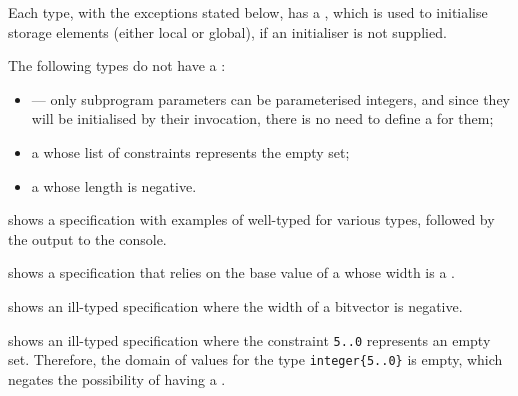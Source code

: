 \hypertarget{def-basevalueterm}{}
Each type, with the exceptions stated below, has a \basevalueterm,
which is used to initialise storage elements (either local or global),
if an initialiser is not supplied.

The following types do not have a \basevalueterm{}:
\begin{itemize}
    \item \parameterizedintegertypesterm{} ---
          only subprogram parameters can be parameterised integers, and since they will be initialised by their
          invocation, there is no need to define a \basevalueterm{} for them;
    \item a \wellconstrainedintegertypeterm{} whose list of constraints
          represents the empty set;
    \item a \bitvectortypeterm{} whose length is negative.
\end{itemize}

 shows a specification with examples of well-typed \basevalueterm{}
for various types, followed by the output to the console.

 shows a specification that relies on the base value of a \bitvectortypeterm{} whose width is a \parameterizedintegertypeterm{}.

 shows an ill-typed specification
where the width of a bitvector is negative.

 shows an ill-typed specification
where the constraint \verb|5..0| represents an empty set.
Therefore, the domain of values for the type \verb|integer{5..0}| is empty,
which negates the possibility of having a \basevalueterm.

